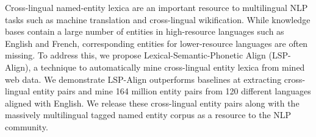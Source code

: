 Cross-lingual named-entity lexica are an important resource to multilingual NLP tasks such as machine translation and cross-lingual wikification. While knowledge bases contain a large number of entities in high-resource languages such as English and French, corresponding entities for lower-resource languages are often missing. To address this, we propose Lexical-Semantic-Phonetic Align (LSP-Align), a technique to automatically mine cross-lingual entity lexica from mined web data. We demonstrate LSP-Align outperforms baselines at extracting cross-lingual entity pairs and mine 164 million entity pairs from 120 different languages aligned with English. We release these cross-lingual entity pairs along with the massively multilingual tagged named entity corpus as a resource to the NLP community.
